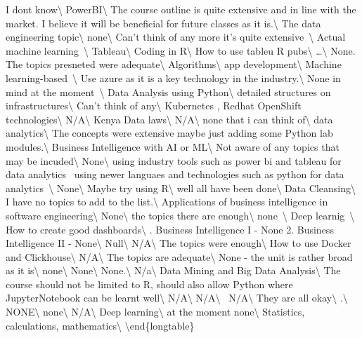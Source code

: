 \documentclass[
]{article}
\begin{document}
\hline I dont know\textbackslash{} \hline PowerBI\textbackslash{} \hline
The course outline is quite extensive and in line with the market. I
believe it will be beneficial for future classes as it
is.\textbackslash{} \hline The data engineering topic\textbackslash{}
\hline none\textbackslash{} \hline Can't think of any more it's quite
extensive~\textbackslash{} \hline Actual machine
learning~\textbackslash{} \hline Tableau\textbackslash{} \hline Coding
in R\textbackslash{} \hline How to use tableu R pubs\textbackslash{}
\hline \ldots\textbackslash{} \hline None. The topics presneted were
adequate\textbackslash{} \hline Algorithms\textbackslash{} \hline app
development\textbackslash{} \hline Machine
learning-based~\textbackslash{} \hline Use azure as it is a key
technology in the industry.\textbackslash{} \hline None in mind at the
moment~\textbackslash{} \hline Data Analysis using
Python\textbackslash{} \hline detailed structures on
infrastructures\textbackslash{} \hline Can't think of
any\textbackslash{} \hline Kubernetes , Redhat OpenShift
technologies\textbackslash{} \hline N/A\textbackslash{} \hline Kenya
Data laws\textbackslash{} \hline N/A\textbackslash{} \hline none that i
can think of\textbackslash{} \hline data analytics\textbackslash{}
\hline The concepts were extensive maybe just adding some Python lab
modules.\textbackslash{} \hline Business Intelligence with AI or
ML\textbackslash{} \hline Not aware of any topics that may be
incuded\textbackslash{} \hline None\textbackslash{} \hline using
industry tools such as power bi and tableau for data analytics~ using
newer languaes and technologies such as python for data
analytics~\textbackslash{} \hline None\textbackslash{} \hline Maybe try
using R\textbackslash{} \hline well all have been done\textbackslash{}
\hline Data Cleansing\textbackslash{} \hline I have no topics to add to
the list.\textbackslash{} \hline Applications of business intelligence
in software engineering\textbackslash{} \hline None\textbackslash{}
\hline the topics there are enough\textbackslash{} \hline
none~\textbackslash{} \hline Deep learnig~\textbackslash{} \hline How to
create good dashboards\textbackslash{} . Business Intelligence I - None 2. Business Intelligence II -
None\textbackslash{} \hline Null\textbackslash{} \hline
N/A\textbackslash{} \hline The topics were enough\textbackslash{} \hline
How to use Docker and Clickhouse\textbackslash{} \hline
N/A\textbackslash{} \hline The topics are adequate\textbackslash{}
\hline None - the unit is rather broad as it is\textbackslash{} \hline
none\textbackslash{} \hline None\textbackslash{} \hline
None.\textbackslash{} \hline N/a\textbackslash{} \hline Data Mining and
Big Data Analysis\textbackslash{} \hline The course should not be
limited to R, should also allow Python where JupyterNotebook can be
learnt well\textbackslash{} \hline N/A\textbackslash{} \hline
N/A\textbackslash{} \hline ~N/A\textbackslash{} \hline They are all
okay\textbackslash{} \hline .\textbackslash{} \hline
NONE\textbackslash{} \hline none\textbackslash{} \hline
N/A\textbackslash{} \hline Deep learning\textbackslash{} \hline at the
moment none\textbackslash{} \hline Statistics, calculations,
mathematics\textbackslash{} \bottomrule \textbackslash end\{longtable\}
\end{document}
